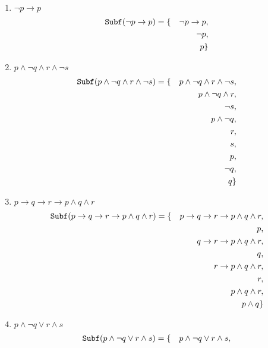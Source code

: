 \documentclass[12pt,a4paper,oneside]{article}
\begin{document}
\begin{enumerate}
		\begin{enumerate}
			\item $\neg p \rightarrow p$ 
			     {\color{verde} \begin{eqnarray*}
										{\tt Subf}(\neg p \rightarrow p) & = \{ & \neg p \rightarrow p,\\
								      		& & \neg p,\\
								      		& & p \}
								 \end{eqnarray*}
				  }
			\item $p \wedge \neg q \wedge r \wedge \neg s$ 
				  {\color{verde} \begin{eqnarray*}
										{\tt Subf}(p \wedge \neg q \wedge r \wedge \neg s) & =  \{ & p \wedge \neg q \wedge r \wedge \neg s,\\
										& & p \wedge \neg q \wedge r, \\
										& & \neg s, \\
										& & p \wedge \neg q, \\
										& & r, \\
										& & s, \\
										& & p, \\
										& & \neg q, \\
										& & q \}
								\end{eqnarray*}
					}
			\item $p \rightarrow q \rightarrow r \rightarrow p \wedge q \wedge r$
				  {\color{verde} \begin{eqnarray*} 
				  {\tt Subf}(p \rightarrow q \rightarrow r \rightarrow p \wedge q \wedge r) & =  
				  \{ & p \rightarrow q \rightarrow r \rightarrow p \wedge q \wedge r,\\
				  		& & p,\\
				  		& & q \rightarrow r \rightarrow p \wedge q \wedge r,\\
				  		& & q,\\
				  		& & r \rightarrow p \wedge q \wedge r,\\
				  		& & r,\\
				  		& & p \wedge q \wedge r,\\
				  		& & p \wedge q\}
				  	\end{eqnarray*}
				  }
			\item $p \wedge \neg q \vee r \wedge s$
			{\color{verde} \begin{eqnarray*} 
				  {\tt Subf}(p \wedge \neg q \vee r \wedge s) & = \{ & p \wedge \neg q \vee r \wedge s,\\

\end{eqnarray*}}
\end{enumerate}
\end{enumerate}
\end{document}
